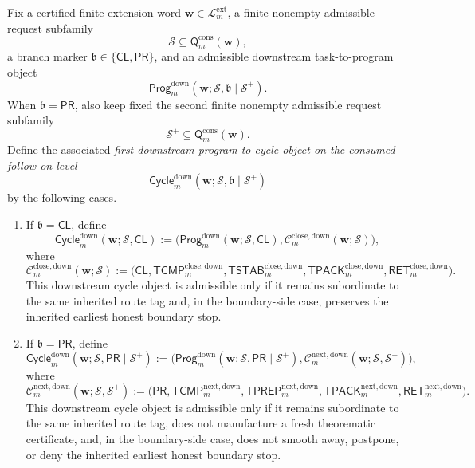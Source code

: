 \begin{definition}
\label{def:first-downstream-program-to-cycle-object-on-the-consumed-follow-on-level}
Fix a certified finite extension word \(\mathbf w\in\mathcal L^{\mathrm{ext}}_{m}\), a finite nonempty admissible request subfamily
\[
  \mathcal S \subseteq \mathsf{Q}^{\mathrm{cons}}_{m}(\mathbf w),
\]
a branch marker \(\mathfrak b\in\{\mathsf{CL},\mathsf{PR}\}\), and an admissible downstream task-to-program object
\[
  \mathsf{Prog}^{\mathrm{down}}_{m}(\mathbf w;\mathcal S,\mathfrak b\mid\mathcal S^{+}).
\]
When \(\mathfrak b=\mathsf{PR}\), also keep fixed the second finite nonempty admissible request subfamily
\[
  \mathcal S^{+}\subseteq \mathsf{Q}^{\mathrm{cons}}_{m}(\mathbf w).
\]
Define the associated \emph{first downstream program-to-cycle object on the consumed follow-on level}
\[
  \mathsf{Cycle}^{\mathrm{down}}_{m}(\mathbf w;\mathcal S,\mathfrak b\mid\mathcal S^{+})
\]
by the following cases.
\begin{enumerate}[label=(\roman*)]
  \item If \(\mathfrak b=\mathsf{CL}\), define
\[
  \mathsf{Cycle}^{\mathrm{down}}_{m}(\mathbf w;\mathcal S,\mathsf{CL})
  :=
  \bigl(\mathsf{Prog}^{\mathrm{down}}_{m}(\mathbf w;\mathcal S,\mathsf{CL}),\mathcal C^{\mathrm{close,down}}_{m}(\mathbf w;\mathcal S)\bigr),
\]
where
\[
  \mathcal C^{\mathrm{close,down}}_{m}(\mathbf w;\mathcal S)
  :=
  \bigl(\mathsf{CL},\mathsf{TCMP}^{\mathrm{close,down}}_{m},\mathsf{TSTAB}^{\mathrm{close,down}}_{m},\mathsf{TPACK}^{\mathrm{close,down}}_{m},\mathsf{RET}^{\mathrm{close,down}}_{m}\bigr).
\]
This downstream cycle object is admissible only if it remains subordinate to the same inherited route tag and, in the boundary-side case, preserves the inherited earliest honest boundary stop.

  \item If \(\mathfrak b=\mathsf{PR}\), define
\[
  \mathsf{Cycle}^{\mathrm{down}}_{m}(\mathbf w;\mathcal S,\mathsf{PR}\mid\mathcal S^{+})
  :=
  \bigl(\mathsf{Prog}^{\mathrm{down}}_{m}(\mathbf w;\mathcal S,\mathsf{PR}\mid\mathcal S^{+}),\mathcal C^{\mathrm{next,down}}_{m}(\mathbf w;\mathcal S,\mathcal S^{+})\bigr),
\]
where
\[
  \mathcal C^{\mathrm{next,down}}_{m}(\mathbf w;\mathcal S,\mathcal S^{+})
  :=
  \bigl(\mathsf{PR},\mathsf{TCMP}^{\mathrm{next,down}}_{m},\mathsf{TPREP}^{\mathrm{next,down}}_{m},\mathsf{TPACK}^{\mathrm{next,down}}_{m},\mathsf{RET}^{\mathrm{next,down}}_{m}\bigr).
\]
This downstream cycle object is admissible only if it remains subordinate to the same inherited route tag, does not manufacture a fresh theorematic certificate, and, in the boundary-side case, does not smooth away, postpone, or deny the inherited earliest honest boundary stop.
\end{enumerate}
\end{definition}

